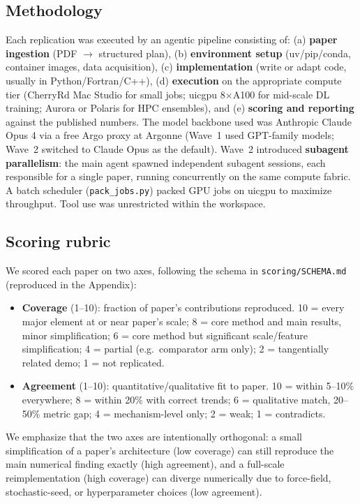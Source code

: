 \subsection{Methodology}
Each replication was executed by an agentic pipeline consisting of:
(a) \textbf{paper ingestion} (PDF $\rightarrow$ structured plan),
(b) \textbf{environment setup} (uv/pip/conda, container images, data
acquisition),
(c) \textbf{implementation} (write or adapt code, usually in
Python/Fortran/C++),
(d) \textbf{execution} on the appropriate compute tier
(CherryRd Mac Studio for small jobs; uicgpu 8$\times$A100 for mid-scale
DL training; Aurora or Polaris for HPC ensembles), and
(e) \textbf{scoring and reporting} against the published numbers.
The model backbone used was Anthropic Claude Opus 4 via a free Argo proxy at
Argonne (Wave~1 used GPT-family models; Wave~2 switched to Claude Opus as the
default). Wave~2 introduced \textbf{subagent parallelism}: the main agent
spawned independent subagent sessions, each responsible for a single paper,
running concurrently on the same compute fabric. A batch scheduler
(\texttt{pack\_jobs.py}) packed GPU jobs on uicgpu to maximize throughput.
Tool use was unrestricted within the workspace.

\subsection{Scoring rubric}
We scored each paper on two axes, following the schema in
\texttt{scoring/SCHEMA.md} (reproduced in the Appendix):
\begin{itemize}
  \item \textbf{Coverage} (1--10): fraction of paper's contributions reproduced.
  10 = every major element at or near paper's scale; 8 = core method and main
  results, minor simplification; 6 = core method but significant scale/feature
  simplification; 4 = partial (e.g.\ comparator arm only); 2 = tangentially
  related demo; 1 = not replicated.
  \item \textbf{Agreement} (1--10): quantitative/qualitative fit to paper.
  10 = within 5--10\% everywhere; 8 = within 20\% with correct trends; 6 =
  qualitative match, 20--50\% metric gap; 4 = mechanism-level only; 2 = weak;
  1 = contradicts.
\end{itemize}
We emphasize that the two axes are intentionally orthogonal: a small
simplification of a paper's architecture (low coverage) can still reproduce the
main numerical finding exactly (high agreement), and a full-scale reimplementation
(high coverage) can diverge numerically due to force-field, stochastic-seed, or
hyperparameter choices (low agreement).


\clearpage
